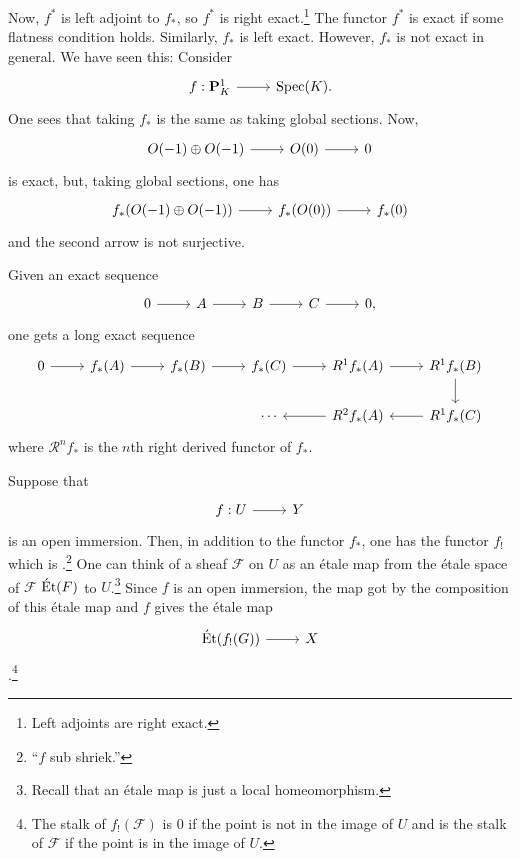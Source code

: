 \documentclass [11 pt, oneside] {article}
\begin{document}
Now, $f^*$ is left adjoint to $f_*$, so $f^*$ is right exact.\footnote{Left adjoints are right exact.} The functor $f^*$ is exact if some flatness condition holds. Similarly, $f_*$ is left exact. However, $f_*$ is not exact in general. We have seen this: Consider 
\[
\begin{tikzcd}
f:\mathbf{P}^1_K\ar[r]& \Spec (K).
\end{tikzcd}
\]
One sees that taking $f_*$ is the same as taking global sections. Now, 
\[
\begin{tikzcd}
	\mathscr{O}(-1) \oplus \mathscr{O}(-1)\ar[r]& \mathscr{O}(0) \ar[r] & 0
\end{tikzcd}
\]
is exact, but, taking global sections, one has
\[
\begin{tikzcd}
 f_*(\mathscr{O}(-1) \oplus \mathscr{O}(-1))\ar[r]& f_*(\mathscr{O}(0)) \ar[r] & f_*(0)
\end{tikzcd}
\]
and the second arrow is not surjective.

Given an exact sequence
\[
\begin{tikzcd}
	0\ar[r]&\mathscr{A}\ar[r]&\mathscr{B}\ar[r]&\mathscr{C}\ar[r]&0,
\end{tikzcd}
\]
one gets a long exact sequence
\[
\begin{tikzcd}
	 0\ar[r] &f_*(\mathscr{A}) \ar[r]& f_*(\mathscr{B})\ar[r]&f_*(\mathscr{C}) \ar[r]&\mathscr{R}^1f_*(\mathscr{A}) \ar[r]&\mathscr{R}^1f_*(\mathscr{B}) \ar[d]\\&&&\cdots&\mathscr{R}^2f_*(\mathscr{A}) \ar[l]&\mathscr{R}^1f_*(\mathscr{C})\ar[l]
\end{tikzcd}
\]
where $\mathscr{R}^nf_*$ is the $n$th right derived functor of $f_*$. 

Suppose that 
\[
\begin{tikzcd}
f:U\ar[r]&Y
\end{tikzcd}
\]
is an open immersion. Then, in addition to the functor $f_*$, one has the functor $f_!$ which is .\footnote{``$f$ sub shriek.''} One can think of a sheaf $\mathscr{F}$ on $U$ as an \'etale map from the \'etale space of $\mathscr{F}$ $\operatorname{\acute Et}(\relax{F})$ to $U$.\footnote{Recall that an \'etale map is just a local homeomorphism.} Since $f$ is an open immersion, the map got by the composition of this \'etale map and $f$ gives the \'etale map 
\[
\begin{tikzcd}
\Et(f_!(\mathscr{G}))\ar[r]& X
\end{tikzcd}
\]
.\footnote{The stalk of $f_!(\mathscr{F})$ is $0$ if the point is not in the image of $U$ and is the stalk of $\mathscr{F}$ if the point is in the image of $U$.}
\end{document}
